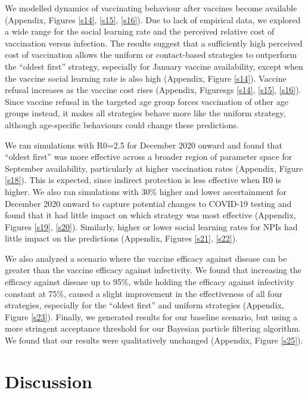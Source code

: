 We modelled dynamics of vaccinating behaviour after vaccines become available (Appendix, Figures \ref{s14}, \ref{s15}, \ref{s16}).  Due to lack of empirical data, we explored a wide range for the social learning rate and the perceived relative cost of vaccination versus infection. The results suggest that a sufficiently high perceived cost of vaccination allows the uniform or contact-based strategies to outperform the “oldest first” strategy, especially for January vaccine availability, except when the vaccine social learning rate is also high (Appendix, Figure \ref{s14}). Vaccine refusal increases as the vaccine cost rises (Appendix, Figuresgs \ref{s14}, \ref{s15}, \ref{s16}). Since vaccine refusal in the targeted age group forces vaccination of other age groups instead, it makes all strategies behave more like the uniform strategy, although age-specific behaviours could change these predictions. 

We ran simulations with R0=2.5 for December 2020 onward and found that “oldest first” was more effective across a broader region of parameter space for September availability, particularly at higher vaccination rates (Appendix, Figure \ref{s18}). This is expected, since indirect protection is less effective when R0 is higher. We also ran simulations with 30\% higher and lower ascertainment for December 2020 onward to capture potential changes to COVID-19 testing and found that it had little impact on which strategy was most effective (Appendix, Figures \ref{s19}, \ref{s20}).  Similarly, higher or lower social learning rates for NPIs had little impact on the predictions (Appendix, Figures \ref{s21}, \ref{s22}). 

We also analyzed a scenario where the vaccine efficacy against disease can be greater than the vaccine efficacy against infectivity. We found that increasing the efficacy against disease up to 95\%, while holding the efficacy against infectivity constant at 75\%, caused a slight improvement in the effectiveness of all four strategies, especially for the “oldest first” and uniform strategies (Appendix, Figure \ref{s23}).  Finally, we generated results for our baseline scenario, but using a more stringent acceptance threshold for our Bayesian particle filtering algorithm. We found that our results were qualitatively unchanged (Appendix, Figure  \ref{s25}).  


\section{Discussion}

